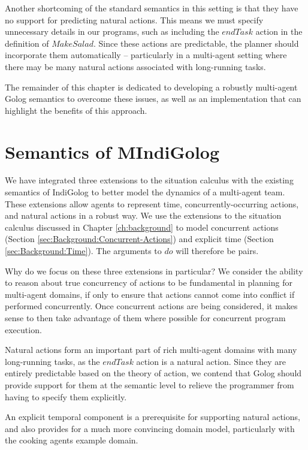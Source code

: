 Another shortcoming of the standard semantics in this setting is that
they have no support for predicting natural actions. This means we
must specify unnecessary details in our programs, such as including
the $endTask$ action in the definition of $MakeSalad$. Since these
actions are predictable, the planner should incorporate them automatically
-- particularly in a multi-agent setting where there may be many natural
actions associated with long-running tasks.

The remainder of this chapter is dedicated to developing a robustly
multi-agent Golog semantics to overcome these issues, as well as an
implementation that can highlight the benefits of this approach.


\section{Semantics of MIndiGolog\label{sec:MIndiGolog:Semantics}}

We have integrated three extensions to the situation calculus with
the existing semantics of IndiGolog to better model the dynamics of
a multi-agent team. These extensions allow agents to represent time,
concurrently-occurring actions, and natural actions in a robust way.
We use the extensions to the situation calculus discussed in Chapter
\ref{ch:background} to model concurrent actions (Section \ref{sec:Background:Concurrent-Actions})
and explicit time (Section \ref{sec:Background:Time}). The arguments
to $do$ will therefore be  pairs.

Why do we focus on these three extensions in particular? We consider
the ability to reason about true concurrency of actions to be fundamental
in planning for multi-agent domains, if only to ensure that actions
cannot come into conflict if performed concurrently. Once concurrent
actions are being considered, it makes sense to then take advantage
of them where possible for concurrent program execution.

Natural actions form an important part of rich multi-agent domains
with many long-running tasks, as the $endTask$ action is a natural
action. Since they are entirely predictable based on the theory of
action, we contend that Golog should provide support for them at the
semantic level to relieve the programmer from having to specify them
explicitly.

An explicit temporal component is a prerequisite for supporting natural
actions, and also provides for a much more convincing domain model,
particularly with the cooking agents example domain.


